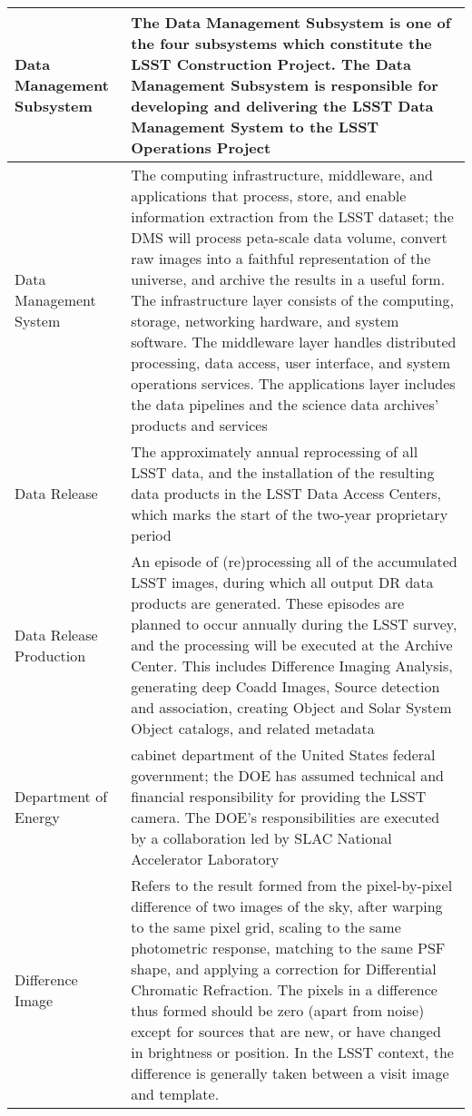 \begin{longtable}{|p{}|p{}|}
Data Management \gls{Subsystem} & The Data Management \gls{Subsystem} is one of the four subsystems which constitute the \gls{LSST} \gls{Construction} Project. The Data Management \gls{Subsystem} is responsible for developing and delivering the \gls{LSST} \gls{Data Management System} to the \gls{LSST} \gls{Operations} Project \\\hline
Data Management System & The computing infrastructure, middleware, and applications that process, store, and enable information extraction from the \gls{LSST} dataset; the \gls{DMS} will process peta-scale data volume, convert raw images into a faithful representation of the universe, and archive the results in a useful form. The infrastructure layer consists of the computing, storage, networking hardware, and system software. The middleware layer handles distributed processing, data access, user interface, and system operations services. The applications layer includes the data pipelines and the science data archives' products and services \\\hline
Data Release & The approximately annual reprocessing of all \gls{LSST} data, and the installation of the resulting data products in the \gls{LSST} Data Access Centers, which marks the start of the two-year proprietary period \\\hline
Data Release Production & An episode of (re)processing all of the accumulated \gls{LSST} images, during which all output \gls{DR} data products are generated. These episodes are planned to occur annually during the \gls{LSST} survey, and the processing will be executed at the \gls{Archive} \gls{Center}. This includes Difference Imaging Analysis, generating deep Coadd Images, \gls{Source} detection and association, creating Object and \gls{Solar System Object} catalogs, and related \gls{metadata} \\\hline
Department of Energy & cabinet department of the United States federal government; the \gls{DOE} has assumed technical and financial responsibility for providing the \gls{LSST} \gls{camera}. The \gls{DOE}'s responsibilities are executed by a collaboration led by \gls{SLAC} National Accelerator Laboratory \\\hline
Difference Image & Refers to the result formed from the pixel-by-pixel difference of two images of the sky, after warping to the same pixel grid, scaling to the same photometric response, matching to the same \gls{PSF} \gls{shape}, and applying a correction for \gls{Differential Chromatic Refraction}. The pixels in a difference thus formed should be zero (apart from noise) except for sources that are new, or have changed in brightness or position. In the \gls{LSST} context, the difference is generally taken between a visit image and template.  \\\hline

\end{longtable}
